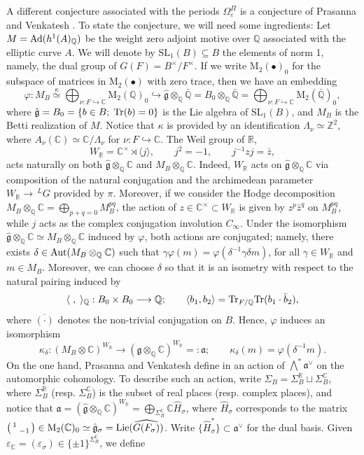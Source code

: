 \documentclass{amsart}
\theoremstyle{definition}
\theoremstyle{remark}
\numberwithin{equation}{section}
\newcommand{\M}{\mathrm{M}}
\newcommand{\SL}{{\mathrm {SL}}}
\newcommand{\Z}{{\mathbb Z}}
\newcommand{\Q}{{\mathbb Q}}
\newcommand{\C}{{\mathbb C}}
\newcommand{\R}{{\mathbb R}}
\newcommand{\mfg}{{\mathfrak g}}
\begin{document}
A different conjecture associated with the periods $\Omega_{\varepsilon}^\Pi$ is a conjecture of Prasanna and Venkatesh \cite{PV}. To state the conjecture, we will need some ingredients: Let $M={\rm Ad}(h^1(A)_\Q)$ be the weight zero adjoint motive over $\Q$ associated with the elliptic curve $A$. We will denote by $\SL_1(B)\subseteq B$ the elements of norm 1, namely, the dual group of $G(F)=B^\times/F^\times$. If we write $\M_2(\bullet)_0$ for the subspace of matrices in $\M_2(\bullet)$ with zero trace, then we have an embedding
\begin{equation}\label{defvarphiBG}
\varphi:M_{B}\stackrel{\kappa}{\simeq}\bigoplus_{\nu:F\hookrightarrow\C}\M_2(\Q)_0\hookrightarrow \hat\mfg\otimes_\Q\bar\Q=B_0\otimes_\Q\bar\Q=\bigoplus_{\nu:F\hookrightarrow\C}\M_2(\bar\Q)_0,
\end{equation}
where $\hat\mfg=B_0=\{b\in B;\;{\rm Tr}(b)=0\}$ is the Lie algebra of $\SL_1(B)$, and $M_{B}$ is the Betti realization of $M$. Notice that $\kappa$ is provided by an identification $\Lambda_{\nu}\simeq\Z^2$, where $A_\nu(\C)\simeq\C/\Lambda_\nu$ for $\nu:F\hookrightarrow\C$. The Weil group of $\R$,  
\[
W_\R=\C^\times\rtimes\langle j\rangle,\qquad j^2=-1,\qquad j^{-1}zj=\bar z,
\]
acts naturally on both $\hat\mfg\otimes_\Q\C$ and $M_B\otimes_\Q\C$. Indeed, $W_\R$ acts on $\hat \mfg\otimes_\Q\C$ via composition of the natural conjugation and the archimedean parameter $W_\R\rightarrow \,^LG$ provided by $\pi$. Moreover, if we consider the Hodge decomposition $M_B\otimes_\Q\C=\bigoplus_{p+q=0}M_B^{pq}$, the action of $z\in \C^\times\subset W_\R$ is given by $z^{p}\bar z^{q}$ on $M_B^{pq}$, while $j$ acts as the complex conjugation involution $C_\infty$. Under the isomorphism $\hat \mfg\otimes_\Q\C\simeq M_B\otimes_\Q\C$ induced by $\varphi$, both actions are conjugated; namely, there exists $\delta\in {\rm Aut}(M_B\otimes_\Q\C)$ such that $\gamma\varphi(m)=\varphi(\delta^{-1}\gamma \delta m)$, for all $\gamma\in W_\R$ and $m\in M_B$. Moreover, we can choose $\delta$ so that it is an isometry with respect to the natural pairing induced by
\[
\langle\;,\;\rangle_\Q:B_0\times B_0\longrightarrow \Q;\qquad \langle b_1,b_2\rangle={\rm Tr}_{F/\Q}{\rm Tr}(b_1\cdot \bar b_2),
\]
where $\overline{(\cdot)}$ denotes the non-trivial conjugation on $B$. Hence, $\varphi$ induces an isomorphism
\[
\kappa_\delta:(M_B\otimes\C)^{W_\R}\longrightarrow (\hat\mfg\otimes_\Q\C)^{W_\R}=:\mathfrak{a};\qquad \kappa_\delta(m)=\varphi(\delta^{-1}m).
\]
On the one hand, Prasanna and Venkatesh define in \cite{PV} an action of $\bigwedge^\ast\mathfrak{a}^{\vee}$ on the automorphic cohomology. To describe such an action, write $\Sigma_{B}=\Sigma_B^\R\sqcup\Sigma_B^\C$, where $\Sigma_B^\R$ (resp. $\Sigma_B^\C$) is the subset of real places (resp. complex places), and notice that $\mathfrak{a}=(\hat\mfg\otimes_\Q\C)^{W_\R}=\bigoplus_{\Sigma_B^\C}\C\hat H_\sigma$, where $\hat H_\sigma$ corresponds to the matrix $\big(\begin{smallmatrix}
    1&\\&-1
\end{smallmatrix}\big)\in \M_2(\C)_0\simeq\hat \mfg_\sigma={\rm Lie}(\widehat{G(F_\sigma)})$. Write $\{\hat H_\sigma^\ast\}\subset\mathfrak{a}^\vee$ for the dual basis. Given $\varepsilon_\C=(\varepsilon_\sigma)\in \{\pm 1\}^{\Sigma_B^\C}$, we define
\end{document}
